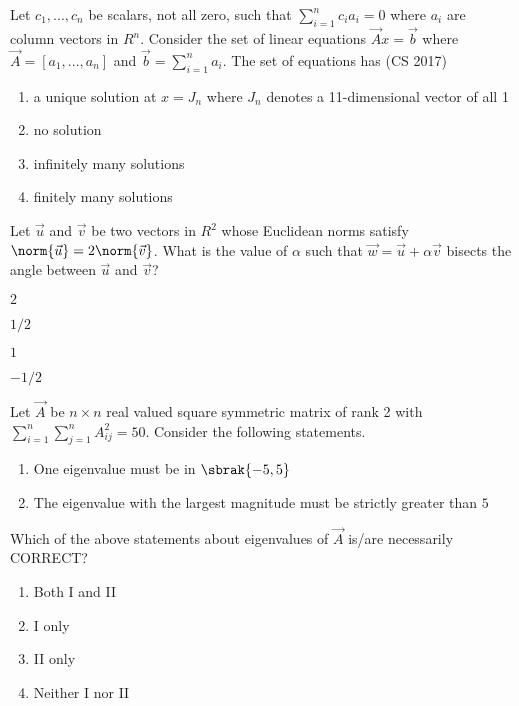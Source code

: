     \item Let $c_{1},...,c_{n}$ be scalars, not all zero, such that $\sum_{i=1}^{n}c_{i}a_{i}=0$ where $a_{i}$ are column vectors in $R^{n}$. Consider the set of linear equations $\vec{A}x=\vec{b}$ where $\vec{A}=[a_{1},...,a_{n}]$ and $\vec{b}=\sum_{i=1}^{n}a_{i}$. The set of equations has
    \hfill (CS 2017)
    \begin{enumerate}
        \item a unique solution at $x=J_{n}$ where $J_{n}$ denotes a 11-dimensional vector of all 1
        \item no solution
        \item infinitely many solutions
        \item finitely many solutions
    \end{enumerate}
    \item Let $\vec{u}$ and $\vec{v}$ be two vectors in $R^{2}$ whose Euclidean norms satisfy $\norm{\vec{u}}=2\norm{\vec{v}}$. What is the value of $\alpha$ such that $\vec{w}=\vec{u}+\alpha \vec{v}$ bisects the angle between $\vec{u}$ and $\vec{v}$?
    \hfill{}
    \begin{enumerate}
        \begin{multicols}{4}
            \item $2$
            \item $1/2$
            \item $1$
            \item $-1/2$
        \end{multicols}
    \end{enumerate}
    \item Let $\vec{A}$ be $n\times n$ real valued square symmetric matrix of rank 2 with $\sum_{i=1}^{n}\sum_{j=1}^{n}A_{ij}^{2}=50.$ Consider the following statements.
    \begin{enumerate}[label=\Roman*]
	    \item One eigenvalue must be in $\sbrak{-5, 5}$
        \item The eigenvalue with the largest magnitude must be strictly greater than $5$
    \end{enumerate}
    Which of the above statements about eigenvalues of $\vec{A}$ is/are necessarily CORRECT?

    \hfill{}
    \begin{multicols}{4}
    \begin{enumerate}
        \item Both I and II
        \item I only
        \item II only
        \item Neither I nor II
    \end{enumerate}
\end{multicols}
